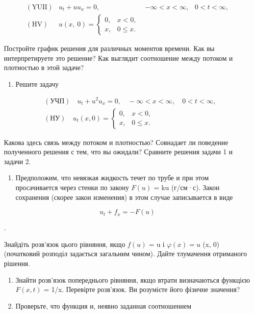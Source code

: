 \documentclass[
  ukrainian,
]{article}
\providecommand{\tightlist}{%
  \setlength{\itemsep}{0pt}\setlength{\parskip}{0pt}}
\begin{document}
\[
\begin{aligned} (\text{YUII}) & u_t + uu_x = 0, & -\infty < x < \infty, & 0 < t < \infty, \\ (\text{HV}) & u(x, \ 0) = \begin{cases} 0, & x < 0, \\ x, & 0 \leqslant x. \end{cases} \end{aligned}
\]

Постройте график решения для различных моментов времени. Как вы
интерпретируете это решение? Как выглядит соотношение между потоком и
плотностью в этой задаче?

\begin{enumerate}
\def\labelenumi{\arabic{enumi}.}
\setcounter{enumi}{1}
\tightlist
\item
  Решите задачу
\end{enumerate}

\[
\begin{split} & (\text{УЧП}) \quad u_t + u^2 u_x = 0, \quad -\infty < x < \infty, \quad 0 < t < \infty, \\ & (\text{НУ}) \quad u_t(x, 0) = \begin{cases} 0, & x < 0, \\ x, & 0 \leqslant x. \end{cases} \end{split}
\]

Какова здесь связь между потоком и плотностью? Совнадает ли поведение
полученного решения с тем, что вы ожидали? Сравните решения задачи 1 и
задачи 2.

\begin{enumerate}
\def\labelenumi{\arabic{enumi}.}
\setcounter{enumi}{2}
\tightlist
\item
  Предположим, что невязкая жидкость течет по трубе и при этом
  просачивается через стенки по закону \(F(u)\) = ku (г/см·с). Закон
  сохранения (скорее закон изменения) в этом случае записывается в виде
\end{enumerate}

\[
u_t + f_x = -F(u)
\]

.

Знайдіть розв'язок цього рівняння, якщо \(f(u)\) = u і
\(\varphi(x) = u\) (x, 0) (початковий розподіл задається загальним
чином). Дайте тлумачення отриманого рішення.

\begin{enumerate}
\def\labelenumi{\arabic{enumi}.}
\setcounter{enumi}{3}
\item
  Знайти розв'язок попереднього рівняння, якщо втрати визначаються
  функцією \(F(x, t)\) = 1/x. Перевірте розв'язок. Ви розумієте його
  фізичне значення?
\item
  Проверьте, что функция и, неявно заданная соотношением
\end{enumerate}
\end{document}
